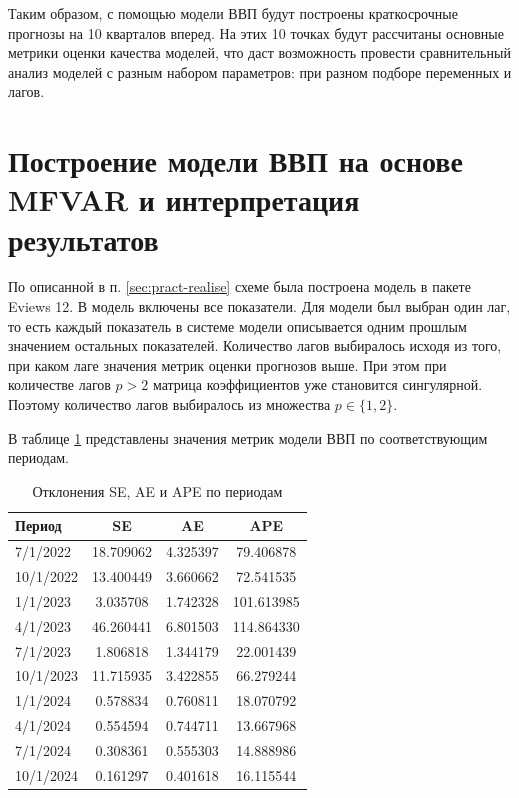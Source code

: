 \documentclass[a4paper, 14pt]{extreport}
\numberwithin{equation}{section}
\numberwithin{equation}{section}
\begin{document}
	Таким образом, с помощью модели ВВП будут построены краткосрочные прогнозы на 10 кварталов вперед. На этих 10 точках будут рассчитаны основные метрики оценки качества моделей, что даст возможность провести сравнительный анализ моделей с разным набором параметров: при разном подборе переменных и лагов.
	
	\section{Построение модели ВВП на основе MFVAR и интерпретация результатов}
	\label{sec:mfvar-1}
	
	По описанной в п. \ref{sec:pract-realise} схеме была построена модель в пакете Eviews 12. В модель включены все показатели. Для модели был выбран один лаг, то есть каждый показатель в системе модели описывается одним прошлым значением остальных показателей. Количество лагов выбиралось исходя из того, при каком лаге значения метрик оценки прогнозов выше. При этом при количестве лагов $p>2$ матрица коэффициентов уже становится сингулярной. Поэтому количество лагов выбиралось из множества $p \in \{1, 2\}$.
	
	В таблице \ref{tab:metrics-1} представлены значения метрик модели ВВП по соответствующим периодам. 
	\begin{table}[h!]
		\centering
		\caption{Отклонения SE, AE и APE по периодам}
		\begin{tabular}{lccc}
			\toprule
			\textbf{Период} & \textbf{SE} & \textbf{AE} & \textbf{APE} \\ 
			\midrule
			7/1/2022  & 18.709062     & 4.325397     & 79.406878     \\ 
			10/1/2022 & 13.400449     & 3.660662     & 72.541535     \\ 
			1/1/2023  & 3.035708      & 1.742328     & 101.613985    \\ 
			4/1/2023  & 46.260441     & 6.801503     & 114.864330    \\ 
			7/1/2023  & 1.806818      & 1.344179     & 22.001439     \\ 
			10/1/2023 & 11.715935     & 3.422855     & 66.279244     \\ 
			1/1/2024  & 0.578834      & 0.760811     & 18.070792     \\ 
			4/1/2024  & 0.554594      & 0.744711     & 13.667968     \\ 
			7/1/2024  & 0.308361      & 0.555303     & 14.888986     \\ 
			10/1/2024 & 0.161297      & 0.401618     & 16.115544     \\ 
			\bottomrule
		\end{tabular}
		\label{tab:metrics-1}
	\end{table}
	
\end{document}
